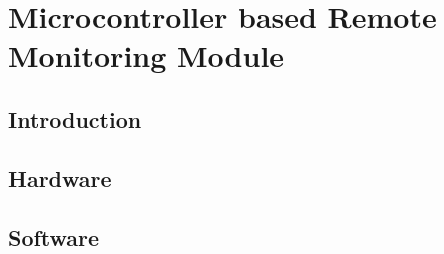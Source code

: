 \chapter{Microcontroller based Remote Monitoring Module}

\section{Introduction}
\section{Hardware}
\section{Software}


